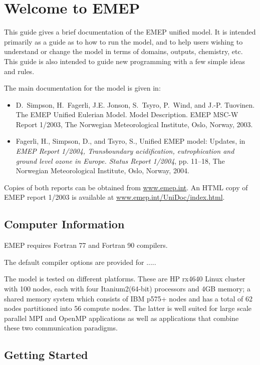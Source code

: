 \chapter{Welcome to EMEP }

This guide gives a brief documentation of the EMEP unified model.
It is intended primarily as a guide as to how to run the model, and
to help users wishing to understand or change 
the model in terms of domains, outputs, chemistry, etc.
This guide is also intended to guide new programming with a few
simple ideas and rules.

The main documentation for the model is given in:

\begin{itemize}
\item
D.~Simpson, H.~Fagerli, J.E. Jonson, S.~Tsyro, P.~Wind, and J.-P. Tuovinen.
{The EMEP Unified Eulerian Model. Model Description}.
EMEP MSC-W Report 1/2003, The Norwegian
Meteorological Institute, Oslo, Norway, 2003.
\item
Fagerli, H., Simpson, D., and Tsyro, S., {Unified EMEP model: Updates}, in {\em
  EMEP Report 1/2004, Transboundary acidification, eutrophication and ground
  level ozone in Europe. Status Report 1/2004\/}, pp. 11--18, The Norwegian
  Meteorological Institute, Oslo, Norway, 2004.
\end{itemize}

Copies of both reports can be obtained from \url{www.emep.int}. An HTML
copy of EMEP report 1/2003 is available at \url{www.emep.int/UniDoc/index.html}.


\section{Computer Information}

EMEP requires Fortran 77 and Fortran 90 compilers.  

The default compiler options are provided for .....

The model is tested on different platforms.  These are HP rx4640 Linux
cluster with 100 nodes, each with four Itanium2(64-bit) processors and
4GB memory; a shared memory system which consists of IBM p575+ nodes
and has a total of 62 nodes partitioned into 56 compute nodes. The
latter is well suited for large scale parallel MPI and OpenMP
applications as well as applications that combine these two
communication paradigms.   

\section{Getting Started}

